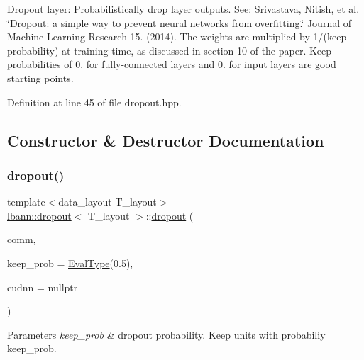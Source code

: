 Dropout layer\+: Probabilistically drop layer outputs. See\+: Srivastava, Nitish, et al. \char`\"{}\+Dropout\+: a simple way to prevent
  neural networks from overfitting.\char`\"{} Journal of Machine Learning Research 15. (2014). The weights are multiplied by 1/(keep probability) at training time, as discussed in section 10 of the paper. Keep probabilities of 0. for fully-\/connected layers and 0. for input layers are good starting points. 

Definition at line 45 of file dropout.\+hpp.



\subsection{Constructor \& Destructor Documentation}
\mbox{\label{classlbann_1_1dropout_a301be902f285c5cf1d0cd743119a09d8}} 
\subsubsection{\texorpdfstring{dropout()}{dropout()}\hspace{0.1cm}{\footnotesize\ttfamily [1/2]}}
{\footnotesize\ttfamily template$<$data\+\_\+layout T\+\_\+layout$>$ \\
\hyperlink{classlbann_1_1dropout}{lbann\+::dropout}$<$ T\+\_\+layout $>$\+::\hyperlink{classlbann_1_1dropout}{dropout} (\begin{DoxyParamCaption}\item[{\hyperlink{classlbann_1_1lbann__comm}{lbann\+\_\+comm} $\ast$}]{comm,  }\item[{\hyperlink{base_8hpp_a3266f5ac18504bbadea983c109566867}{Eval\+Type}}]{keep\+\_\+prob = {\ttfamily \hyperlink{base_8hpp_a3266f5ac18504bbadea983c109566867}{Eval\+Type}(0.5)},  }\item[{\hyperlink{classlbann_1_1cudnn_1_1cudnn__manager}{cudnn\+::cudnn\+\_\+manager} $\ast$}]{cudnn = {\ttfamily nullptr} }\end{DoxyParamCaption})\hspace{0.3cm}{\ttfamily [inline]}}


\begin{DoxyParams}{Parameters}
{\em keep\+\_\+prob} & dropout probability. Keep units with probabiliy keep\+\_\+prob. \\
\hline
\end{DoxyParams}


